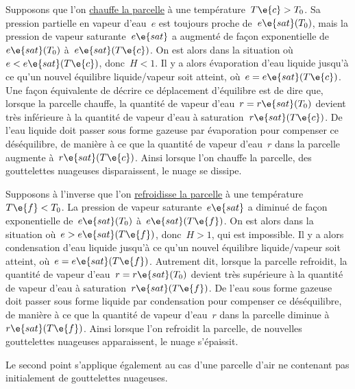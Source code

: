 \begin{finger}
\item
Supposons que l'on \underline{chauffe la parcelle} à une température~$T\e{c}>T_0$. Sa pression partielle en vapeur d'eau~$e$ est toujours proche de~$e\e{sat}(T_0)$, mais la pression de vapeur saturante~$e\e{sat}$ a augmenté de façon exponentielle de~$e\e{sat}(T_0)$ à~$e\e{sat}(T\e{c})$. On est alors dans la situation où~$e < e\e{sat}(T\e{c})$, donc~$H < 1$. Il y a alors évaporation d'eau liquide jusqu'à ce qu'un nouvel équilibre liquide/vapeur soit atteint, où~$e = e\e{sat}(T\e{c})$. Une façon équivalente de décrire ce déplacement d'équilibre est de dire que, lorsque la parcelle chauffe, la quantité de vapeur d'eau~$r=r\e{sat}(T_0)$ devient très inférieure à la quantité de vapeur d'eau à saturation~$r\e{sat}(T\e{c})$. De l'eau liquide doit passer sous forme gazeuse par évaporation pour compenser ce déséquilibre, de manière à ce que la quantité de vapeur d'eau~$r$ dans la parcelle augmente à~$r\e{sat}(T\e{c})$. Ainsi lorsque l'on chauffe la parcelle, des gouttelettes nuageuses disparaissent, le nuage se dissipe.
\item
Supposons à l'inverse que l'on \underline{refroidisse la parcelle} à une température~$T\e{f}<T_0$. La pression de vapeur saturante~$e\e{sat}$ a diminué de façon exponentielle de~$e\e{sat}(T_0)$ à~$e\e{sat}(T\e{f})$. On est alors dans la situation où~$e > e\e{sat}(T\e{f})$, donc~$H > 1$, qui est impossible. Il y a alors condensation d'eau liquide jusqu'à ce qu'un nouvel équilibre liquide/vapeur soit atteint, où~$e = e\e{sat}(T\e{f})$. Autrement dit, lorsque la parcelle refroidit, la quantité de vapeur d'eau~$r=r\e{sat}(T_0)$ devient très supérieure à la quantité de vapeur d'eau à saturation~$r\e{sat}(T\e{f})$. De l'eau sous forme gazeuse doit passer sous forme liquide par condensation pour compenser ce déséquilibre, de manière à ce que la quantité de vapeur d'eau~$r$ dans la parcelle diminue à~$r\e{sat}(T\e{f})$. Ainsi lorsque l'on refroidit la parcelle, de nouvelles gouttelettes nuageuses apparaissent, le nuage s'épaissit.
\end{finger}

\sk
Le second point s'applique également au cas d'une parcelle d'air ne contenant pas initialement de gouttelettes nuageuses. 

